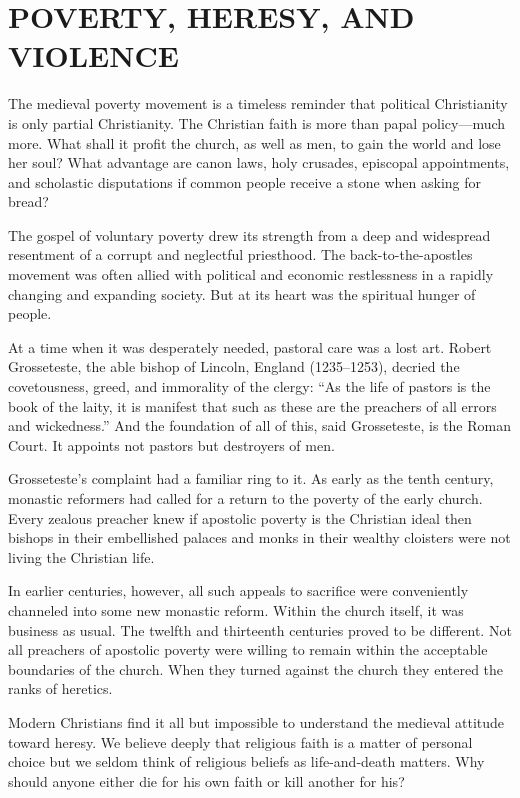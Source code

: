 \section{POVERTY, HERESY, AND VIOLENCE}

The medieval poverty movement is a timeless reminder that political Christianity is only partial
Christianity. The Christian faith is more than papal policy—much more. What shall it profit the
church, as well as men, to gain the world and lose her soul? What advantage are canon laws, holy
crusades, episcopal appointments, and scholastic disputations if common people receive a stone when
asking for bread?

The gospel of voluntary poverty drew its strength from a deep and widespread resentment of a corrupt
and neglectful priesthood. The back-to-the-apostles movement was often allied with political and
economic restlessness in a rapidly changing and expanding society. But at its heart was the
spiritual hunger of people.

At a time when it was desperately needed, pastoral care was a lost art. Robert Grosseteste, the able
bishop of Lincoln, England (1235–1253), decried the covetousness, greed, and immorality of the
clergy: “As the life of pastors is the book of the laity, it is manifest that such as these are the
preachers of all errors and wickedness.” And the foundation of all of this, said Grosseteste, is the
Roman Court. It appoints not pastors but destroyers of men.

Grosseteste’s complaint had a familiar ring to it. As early as the tenth century, monastic reformers
had called for a return to the poverty of the early church. Every zealous preacher knew if apostolic
poverty is the Christian ideal then bishops in their embellished palaces and monks in their wealthy
cloisters were not living the Christian life.

In earlier centuries, however, all such appeals to sacrifice were conveniently channeled into some
new monastic reform. Within the church itself, it was business as usual. The twelfth and thirteenth
centuries proved to be different. Not all preachers of apostolic poverty were willing to remain
within the acceptable boundaries of the church. When they turned against the church they entered the
ranks of heretics.

Modern Christians find it all but impossible to understand the medieval attitude toward heresy. We
believe deeply that religious faith is a matter of personal choice but we seldom think of religious
beliefs as life-and-death matters. Why should anyone either die for his own faith or kill another
for his?

